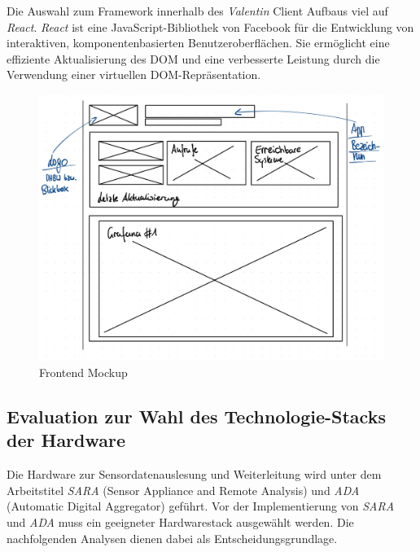 \documentclass[
]{article}
\begin{document}
Die Auswahl zum Framework innerhalb des \textit{Valentin} Client Aufbaus viel auf \textit{React}. \textit{React} ist eine JavaScript-Bibliothek von Facebook für die Entwicklung von interaktiven, komponentenbasierten Benutzeroberflächen. Sie ermöglicht eine effiziente Aktualisierung des DOM und eine verbesserte Leistung durch die Verwendung einer virtuellen DOM-Repräsentation.

\begin{figure}[H]
	\centering
	\includegraphics[width=160mm]{resources/femockup-1.jpg}
	\caption{Frontend Mockup}
	\label{fig:FrontendMockup}
\end{figure}  

\subsection{Evaluation zur Wahl des Technologie-Stacks der Hardware}

Die Hardware zur Sensordatenauslesung und Weiterleitung wird unter dem Arbeitstitel \textit{SARA} (Sensor Appliance and Remote Analysis) und \textit{ADA} (Automatic Digital Aggregator) geführt. Vor der Implementierung von \textit{SARA} und \textit{ADA} muss ein geeigneter Hardwarestack ausgewählt werden. Die nachfolgenden Analysen dienen dabei als Entscheidungsgrundlage.
\end{document}
